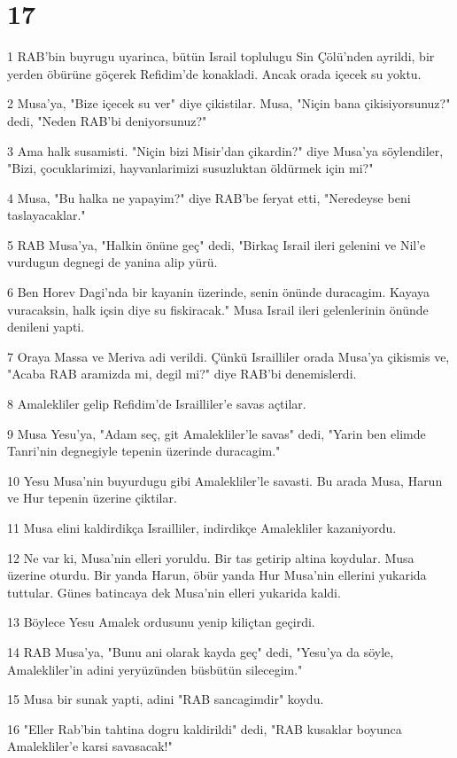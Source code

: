 \chapter{17}

\par 1 RAB'bin buyrugu uyarinca, bütün Israil toplulugu Sin Çölü'nden ayrildi, bir yerden öbürüne göçerek Refidim'de konakladi. Ancak orada içecek su yoktu.
\par 2 Musa'ya, "Bize içecek su ver" diye çikistilar. Musa, "Niçin bana çikisiyorsunuz?" dedi, "Neden RAB'bi deniyorsunuz?"
\par 3 Ama halk susamisti. "Niçin bizi Misir'dan çikardin?" diye Musa'ya söylendiler, "Bizi, çocuklarimizi, hayvanlarimizi susuzluktan öldürmek için mi?"
\par 4 Musa, "Bu halka ne yapayim?" diye RAB'be feryat etti, "Neredeyse beni taslayacaklar."
\par 5 RAB Musa'ya, "Halkin önüne geç" dedi, "Birkaç Israil ileri gelenini ve Nil'e vurdugun degnegi de yanina alip yürü.
\par 6 Ben Horev Dagi'nda bir kayanin üzerinde, senin önünde duracagim. Kayaya vuracaksin, halk içsin diye su fiskiracak." Musa Israil ileri gelenlerinin önünde denileni yapti.
\par 7 Oraya Massa ve Meriva adi verildi. Çünkü Israilliler orada Musa'ya çikismis ve, "Acaba RAB aramizda mi, degil mi?" diye RAB'bi denemislerdi.
\par 8 Amalekliler gelip Refidim'de Israilliler'e savas açtilar.
\par 9 Musa Yesu'ya, "Adam seç, git Amalekliler'le savas" dedi, "Yarin ben elimde Tanri'nin degnegiyle tepenin üzerinde duracagim."
\par 10 Yesu Musa'nin buyurdugu gibi Amalekliler'le savasti. Bu arada Musa, Harun ve Hur tepenin üzerine çiktilar.
\par 11 Musa elini kaldirdikça Israilliler, indirdikçe Amalekliler kazaniyordu.
\par 12 Ne var ki, Musa'nin elleri yoruldu. Bir tas getirip altina koydular. Musa üzerine oturdu. Bir yanda Harun, öbür yanda Hur Musa'nin ellerini yukarida tuttular. Günes batincaya dek Musa'nin elleri yukarida kaldi.
\par 13 Böylece Yesu Amalek ordusunu yenip kiliçtan geçirdi.
\par 14 RAB Musa'ya, "Bunu ani olarak kayda geç" dedi, "Yesu'ya da söyle, Amalekliler'in adini yeryüzünden büsbütün silecegim."
\par 15 Musa bir sunak yapti, adini "RAB sancagimdir" koydu.
\par 16 "Eller Rab'bin tahtina dogru kaldirildi" dedi, "RAB kusaklar boyunca Amalekliler'e karsi savasacak!"

